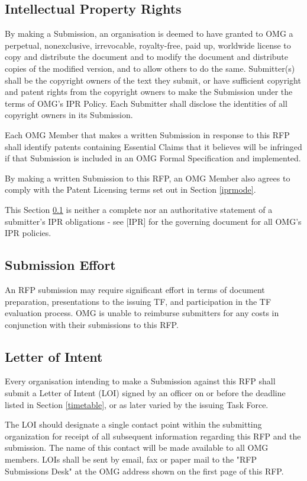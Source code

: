 \subsection{Intellectual Property Rights}
\label{ipr}
By making a Submission, an organisation is deemed to have granted to OMG a perpetual, nonexclusive, irrevocable, royalty-free, paid up, worldwide license to copy and distribute the document and to modify the document and distribute copies of the modified version, and to allow others to do the same. Submitter(s) shall be the copyright owners of the text they submit, or have sufficient copyright and patent rights from the copyright owners to make the Submission under the terms of OMG's IPR Policy. Each Submitter shall disclose the identities of all copyright owners in its Submission.

Each OMG Member that makes a written Submission in response to this RFP shall identify patents containing Essential Claims that it believes will be infringed if that Submission is included in an OMG Formal Specification and implemented.

By making a written Submission to this RFP, an OMG Member also agrees to comply with the Patent Licensing terms set out in Section \ref{iprmode}.

This Section \ref{ipr} is neither a complete nor an authoritative statement of a submitter's IPR obligations - see [IPR] for the governing document for all OMG's IPR policies. 


\subsection{Submission Effort}

An RFP submission may require significant effort in terms of document preparation, presentations to the issuing TF, and participation in the TF evaluation process. OMG is unable to reimburse submitters for any costs in conjunction with their submissions to this RFP.


\subsection{Letter of Intent}

Every organisation intending to make a Submission against this RFP shall submit a Letter of Intent (LOI) signed by an officer on or before the deadline listed in Section \ref{timetable}, or as later varied by the issuing Task Force.

The LOI should designate a single contact point within the submitting organization for receipt of all subsequent information regarding this RFP and the submission. The name of this contact will be made available to all OMG members. LOIs shall be sent by email, fax or paper mail to the "RFP Submissions Desk" at the OMG address shown on the first page of this RFP.

